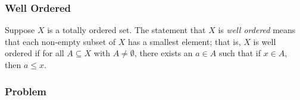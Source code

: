 
        \subsubsection{Well Ordered}
    
            \begin{definition}
                Suppose $X$ is a totally ordered set. The statement that $X$ is \textit{well ordered} means that each non-empty subset of $X$ has a smallest element; that is, $X$ is well ordered if for all $A \subseteq X$ with $A\ne \emptyset$, there exists an $a \in A$ such that if $x \in A$, then $a \leq x$.
            \end{definition}

        \subsubsection{Problem}




